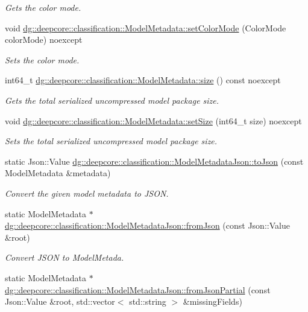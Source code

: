 \begin{DoxyCompactItemize}
\begin{DoxyCompactList}\small\item\em Gets the color mode. \end{DoxyCompactList}\item 
void \hyperlink{group___classification_module_ga82fe704a35392f9a4a91469464e982c2}{dg\+::deepcore\+::classification\+::\+Model\+Metadata\+::set\+Color\+Mode} (Color\+Mode color\+Mode) noexcept
\begin{DoxyCompactList}\small\item\em Sets the color mode. \end{DoxyCompactList}\item 
int64\+\_\+t \hyperlink{group___classification_module_gae7ab9c52670087042f53dfb8b6c26e0c}{dg\+::deepcore\+::classification\+::\+Model\+Metadata\+::size} () const noexcept
\begin{DoxyCompactList}\small\item\em Gets the total serialized uncompressed model package size. \end{DoxyCompactList}\item 
void \hyperlink{group___classification_module_ga7acb468cd6e0f06a423940720ae37a30}{dg\+::deepcore\+::classification\+::\+Model\+Metadata\+::set\+Size} (int64\+\_\+t size) noexcept
\begin{DoxyCompactList}\small\item\em Sets the total serialized uncompressed model package size. \end{DoxyCompactList}\item 
static Json\+::\+Value \hyperlink{group___classification_module_ga5ec8400c84d8e2898a2c6c68c48b4bad}{dg\+::deepcore\+::classification\+::\+Model\+Metadata\+Json\+::to\+Json} (const Model\+Metadata \&metadata)
\begin{DoxyCompactList}\small\item\em Convert the given model metadata to J\+S\+ON. \end{DoxyCompactList}\item 
static Model\+Metadata $\ast$ \hyperlink{group___classification_module_ga330b066361d952da97e7b1e8b2860c5f}{dg\+::deepcore\+::classification\+::\+Model\+Metadata\+Json\+::from\+Json} (const Json\+::\+Value \&root)
\begin{DoxyCompactList}\small\item\em Convert J\+S\+ON to Model\+Metada. \end{DoxyCompactList}\item 
static Model\+Metadata $\ast$ \hyperlink{group___classification_module_ga09b81c4a7b02f8a6fc24a1115b6a29f9}{dg\+::deepcore\+::classification\+::\+Model\+Metadata\+Json\+::from\+Json\+Partial} (const Json\+::\+Value \&root, std\+::vector$<$ std\+::string $>$ \&missing\+Fields)

\end{DoxyCompactItemize}
